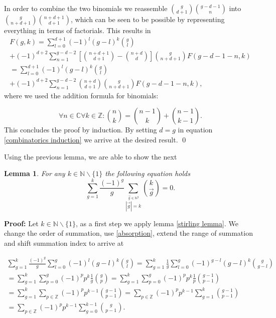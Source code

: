 \documentclass[b5paper,draft,openbib,12pt]{memoir}
\newtheorem{Lemma}[Def]{Lemma}
\begin{document}
In order to combine the two binomials we reassemble \(\binom{g}{d+1}\binom{g-d-1}{n}\) 
into \(\binom{g}{n+d+1}\binom{n+d+1}{d+1}\), which can be seen to be possible by representing everything
in terms of factorials. This results in
\begin{multline}
F(g,k)= \sum_{l=0}^{d+1} (-1)^l (g-l)^k \binom{g}{l}\\
+(-1)^{d+2} \sum_{n=1}^{g-d-2}\left[\binom{n+d+1}{d+1} - \binom{n+d}{d}\right] \binom{g}{n+d+1} 
 F(g-d-1-n,k)\\
=\sum_{l=0}^{d+1} (-1)^l (g-l)^k \binom{g}{l}\\
+(-1)^{d+2}  \sum_{n=1}^{g-d-2} \binom{n+d}{d+1} \binom{g}{n+d+1}  F(g-d-1-n,k),
\end{multline}
where we used the addition formula for binomials:

\begin{equation}
\forall n\in \mathbb{C} \forall k \in \mathbb{Z}: \binom{n}{k} = \binom{n-1}{k} + \binom{n-1}{k-1}.
\end{equation}
This concludes the proof by induction. By setting \(d=g\) in equation \eqref{combinatorics induction} 
we arrive at the desired result. \qed

Using the previous lemma, we are able to show the next

\begin{Lemma}\label{combinatorics weak conjecture lemma 2}
For any \(k \in \mathbb{N}\backslash \{1\}\) the following equation holds
\begin{equation}
\sum_{g=1}^k \frac{(-1)^g}{g} \sum_{\stackrel{\vec{g}\in\mathbb{N}^g}{|\vec{g}|=k}}\binom{k}{\vec{g}}=0.
\end{equation}
\end{Lemma}
\textbf{Proof:} Let \(k\in\mathbb{N}\backslash\{1\}\), as a first step we apply lemma \ref{stirling lemma}.
We change the order of summation, use \eqref{absorption}, extend the range of summation and shift 
summation index  to arrive at

\begin{multline}
\sum_{g=1}^k \frac{(-1)^g}{g} \sum_{l=0}^g (-1)^l (g-l)^k \binom{g}{l}
= \sum_{g=1}^k \frac{1}{g} \sum_{l=0}^g (-1)^{g-l} (g-l)^k \binom{g}{g-l}\\
= \sum_{g=1}^k \sum_{p=0}^g (-1)^{p} p^k \frac{1}{g} \binom{g}{p}
=\sum_{g=1}^k \sum_{p=0}^g (-1)^{p} p^k \frac{1}{p} \binom{g-1}{p-1}\\
=\sum_{g=1}^k \sum_{p\in\mathbb{Z}} (-1)^{p} p^{k-1}\binom{g-1}{p-1}
=\sum_{p\in\mathbb{Z}} (-1)^{p} p^{k-1} \sum_{g=1}^k \binom{g-1}{p-1}\\
=\sum_{p\in\mathbb{Z}} (-1)^{p} p^{k-1} \sum_{g=0}^{k-1} \binom{g}{p-1}.
\end{multline}
\end{document}
